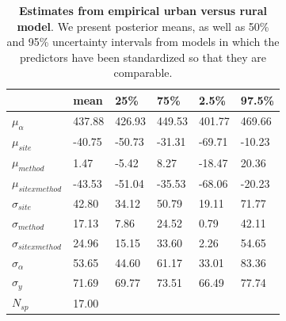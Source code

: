 \documentclass{article}\usepackage[]{graphicx}\usepackage[]{color}
\begin{document}
\begin{table}[ht]
\centering
\caption{\textbf{Estimates from empirical urban versus rural model}. We present posterior means, as well as 50\% and 95\% uncertainty intervals from models in which the predictors have been standardized so that they are comparable.} 
\label{tab:real}
\begingroup\footnotesize
\begin{tabular}{|p{}|p{}p{}p{}p{}p{}|}
  \hline
 & mean & 25\% & 75\% & 2.5\% & 97.5\% \\ 
  \hline
$\mu_{\alpha}$ & 437.88 & 426.93 & 449.53 & 401.77 & 469.66 \\ 
  $\mu_{site}$ & -40.75 & -50.73 & -31.31 & -69.71 & -10.23 \\ 
  $\mu_{method}$ & 1.47 & -5.42 & 8.27 & -18.47 & 20.36 \\ 
  $\mu_{sitexmethod}$ & -43.53 & -51.04 & -35.53 & -68.06 & -20.23 \\ 
  $\sigma_{site}$ & 42.80 & 34.12 & 50.79 & 19.11 & 71.77 \\ 
  $\sigma_{method}$ & 17.13 & 7.86 & 24.52 & 0.79 & 42.11 \\ 
  $\sigma_{sitexmethod}$ & 24.96 & 15.15 & 33.60 & 2.26 & 54.65 \\ 
  $\sigma_{\alpha}$ & 53.65 & 44.60 & 61.17 & 33.01 & 83.36 \\ 
  $\sigma_{y}$ & 71.69 & 69.77 & 73.51 & 66.49 & 77.74 \\ 
   \hline
$N_{sp}$ & 17.00 &  &  &  &  \\ 
   \hline
\end{tabular}
\endgroup
\end{table}
\end{document}
